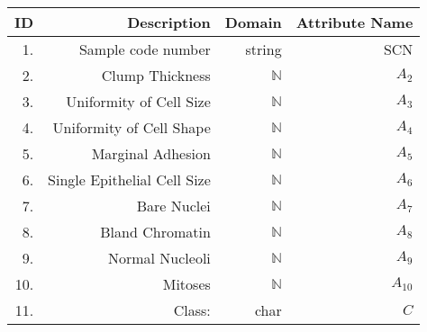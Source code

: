 \documentclass{article}
\begin{document}
\begin{center}
\begin{tabular}[h]{rrrr}
\textsf{ID} & \textsf{Description} & \textsf{Domain} & \textsf{Attribute Name} \\ \hline \hline
 1. & Sample code number        &    string & SCN \\ 
   2.& Clump Thickness             &  $\mathbb{N}$ & $A_2$ \\
   3.& Uniformity of Cell Size     &  $\mathbb{N}$ & $A_3$\\
   4.& Uniformity of Cell Shape  &   $\mathbb{N}$ & $A_4$\\
   5.& Marginal Adhesion           &  $\mathbb{N}$ & $A_5$\\
   6.& Single Epithelial Cell Size  & $\mathbb{N}$ & $A_6$\\
   7.& Bare Nuclei                  & $\mathbb{N}$ & $A_7$\\
   8.& Bland Chromatin          &     $\mathbb{N}$ & $A_8$\\
   9.& Normal Nucleoli           &    $\mathbb{N}$ & $A_9$\\
  10.& Mitoses                       & $\mathbb{N}$ & $A_{10}$\\
  11.& Class:                       & char &  $C$ \\ \hline 
  \end{tabular}
\end{center}
\end{document}
